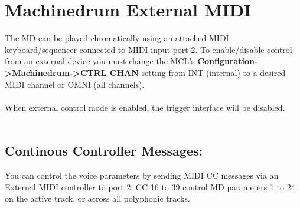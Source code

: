 \section{Machinedrum External MIDI}
The MD can be played chromatically using an attached MIDI keyboard/sequencer connected to MIDI input port 2.
To enable/disable control from an external device you must change the MCL's \textbf{Configuration->Machinedrum->CTRL CHAN} setting from INT (internal) to a desired MIDI channel or OMNI (all channels).\\
\\
When external control mode is enabled, the trigger interface will be disabled.\\\\
\subsection{Continous Controller Messages:}
You can control the voice parameters by sending MIDI CC messages via an External MIDI controller to port 2. CC 16 to 39 control MD parameters 1 to 24 on the active track, or across all polyphonic tracks.

